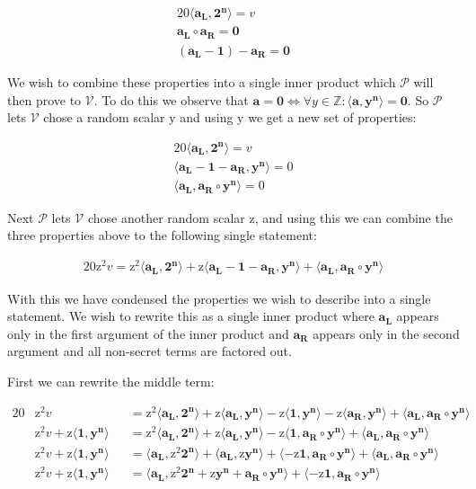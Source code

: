 \documentclass{article}
\newcommand{\eq}[1]{\begin{alignat*}{20}#1\end{alignat*}}
\renewcommand{\vec}[1]{\boldsymbol{#1}}
\newcommand{\ran}[1]{\mathrm{#1}}
\newcommand{\vecran}[1]{\mathbf{#1}}
\newcommand{\V}{\mathcal{V}}
\renewcommand{\P}{\mathcal{P}}
\newcommand{\dotp}[2]{\langle #1, #2 \rangle}
\newcommand{\opn}[1]{\operatorname{#1}}
\newcommand{\vecl}[1]{\vec{#1_{\opn{L}}}}
\newcommand{\vecr}[1]{\vec{#1_{\opn{R}}}}
\begin{document}
\eq{
	\dotp{\vecl{a}}{\vec{2^n}} = v \\
	\vecl{a}\circ \vecr{a} = \vec{0} \\
	(\vecl{a} - \vec{1}) - \vecr{a} = \vec{0}
}

We wish to combine these properties into a single inner product which
$\P$ will then prove to $\V$. To do this we observe that $\vec{a}
= \vec{0} \iff \forall y\in\mathbb{Z}: \dotp{\vec{a}}{\vec{y^n}} =
\vec{0}$. So $\P$ lets $\V$ chose a random scalar $\ran{y}$ and using
$\ran{y}$ we get a new set of properties:

\eq{
	\dotp{\vecl{a}}{\vec{2^n}} = v \\
	\dotp{\vecl{a} - \vec{1} - \vecr{a}}{\vecran{y^n}} = 0 \\
	\dotp{\vecl{a}}{\vecr{a}\circ \vecran{y^n}} = 0
}

Next $\P$ lets $\V$ chose another random scalar $\ran{z}$, and using
this we can combine the three properties above to the following single
statement:

\eq{
	\ran{z^2}v = 
	\ran{z^2}\dotp{\vecl{a}}{\vec{2^n}} +
	\ran{z}\dotp{\vecl{a} - \vec{1} - \vecr{a}}{\vecran{y^n}} +
	\dotp{\vecl{a}}{\vecr{a}\circ \vecran{y^n}}
}

With this we have condensed the properties we wish to describe into
a single statement. We wish to rewrite this as a single inner product
where $\vecl{a}$ appears only in the first argument of the inner product
and $\vecr{a}$ appears only in the second argument and all non-secret
terms are factored out.

First we can rewrite the middle term:

\eq{	
	&\ran{z^2}v &&= 
	\ran{z^2}\dotp{\vecl{a}}{\vec{2^n}} +
	\ran{z}\dotp{\vecl{a}}{\vecran{y^n}} -
	\ran{z}\dotp{\vec{1}}{\vecran{y^n}} -
	\ran{z}\dotp{\vecr{a}}{\vecran{y^n}} +
	\dotp{\vecl{a}}{\vecr{a}\circ \vecran{y^n}} \\
	&\ran{z^2}v + \ran{z}\dotp{\vec{1}}{\vecran{y^n}} 
	&&= \ran{z^2}\dotp{\vecl{a}}{\vec{2^n}} +
	\ran{z}\dotp{\vecl{a}}{\vecran{y^n}} -
	\ran{z}\dotp{\vec{1}}{\vecr{a}\circ\vecran{y^n}} +
	\dotp{\vecl{a}}{\vecr{a}\circ \vecran{y^n}} \\
	&\ran{z^2}v + \ran{z}\dotp{\vec{1}}{\vecran{y^n}} 
	&&= \dotp{\vecl{a}}{\ran{z^2}\vec{2^n}} +
	\dotp{\vecl{a}}{\ran{z}\vecran{y^n}} +
	\dotp{-\ran{z}\vec{1}}{\vecr{a}\circ\vecran{y^n}} +
	\dotp{\vecl{a}}{\vecr{a}\circ \vecran{y^n}} \\
	&\ran{z^2}v + \ran{z}\dotp{\vec{1}}{\vecran{y^n}} 
	&&= \dotp{\vecl{a}}{\ran{z^2}\vec{2^n} + \ran{z}\vecran{y^n} + \vecr{a}\circ \vecran{y^n}} +
	\dotp{-\ran{z}\vec{1}}{\vecr{a}\circ\vecran{y^n}}
}
\end{document}
